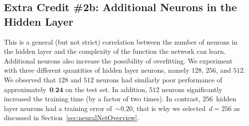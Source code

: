 \documentclass{report}
\begin{document}
  
  \subsection{Extra Credit \#2b: Additional Neurons in the Hidden Layer}
  
  This is a general (but not strict) correlation between the number of neurons in the hidden layer and the complexity of the function the network can learn.  Additional neurons also increase the possibility of overfitting.  We experiment with three different quantities of hidden layer neurons, namely $128$, $256$, and $512$.  We observed that $128$ and $512$ neurons had similarly poor performance of approximately~$\textbf{0.24}$ on the test set.  In addition, $512$ neurons significantly increased the training time (by a factor of two times).  In contrast, $256$~hidden layer neurons had a training error of~$\sim0.20$, that is why we selected~$d=256$ as discussed in Section~\ref{sec:neuralNetOverview}.
     
\end{document}

